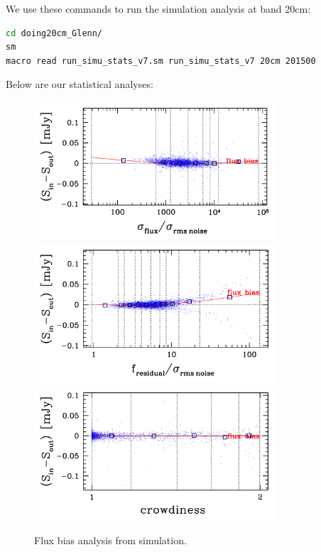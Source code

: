 \documentclass[11pt,a4paper]{article}
\begin{document}
We use these commands to run the simulation analysis at band 20cm:

\begin{lstlisting}[language=bash]
cd doing20cm_Glenn/
sm
macro read run_simu_stats_v7.sm run_simu_stats_v7 20cm 201500
\end{lstlisting}

Below are our statistical analyses:

\begin{figure}[H]
	\includegraphics[width=0.8\textwidth]{galsim_20cm_Glenn_fbias_1}
	\includegraphics[width=0.8\textwidth]{galsim_20cm_Glenn_fbias_2}
	\includegraphics[width=0.8\textwidth]{galsim_20cm_Glenn_fbias_3}
	\caption{Flux bias analysis from simulation.}
\end{figure}
\end{document}
